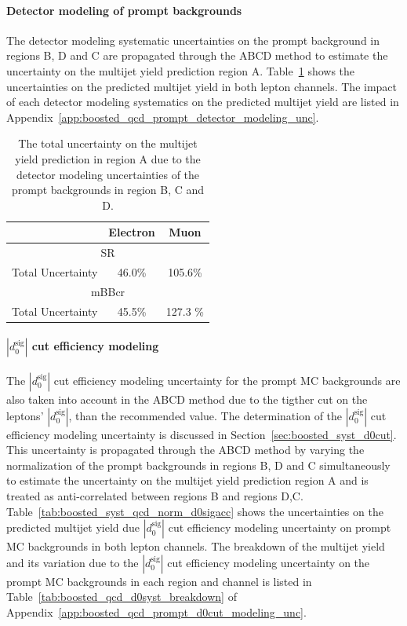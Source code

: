 \paragraph{Detector modeling of prompt backgrounds}
 The detector modeling systematic uncertainties
on the prompt background in regions B, D and C are propagated through the ABCD method to estimate
the uncertainty on the multijet yield prediction region A. Table~\ref{tab:boosted_syst_qcd_norm_detmodel}
shows the uncertainties on the predicted multijet yield in both lepton channels. The impact of each detector
modeling systematics on the predicted multijet yield are listed in Appendix~\ref{app:boosted_qcd_prompt_detector_modeling_unc}.
 
\begin{table}[!htbp]
\begin{center}
\begin{tabular}{c|c|c}
& Electron  & Muon  \\  
\hline
\multicolumn{3}{c}{SR} \\
\hline
Total Uncertainty          &  46.0\%  &  105.6\%   \\
\hline
\multicolumn{3}{c}{mBBcr} \\
\hline
Total Uncertainty          &  45.5\%  &  127.3  \%   \\
\hline
\end{tabular}
\end{center}
\caption{The total uncertainty on the multijet yield prediction in region A due to the detector modeling
uncertainties of the prompt backgrounds in region B, C and D.}
\label{tab:boosted_syst_qcd_norm_detmodel}
\end{table}
 
\paragraph{$|d_{0}^{\textrm{sig}}|$ cut efficiency modeling}
The $|d_{0}^{\textrm{sig}}|$ cut efficiency modeling uncertainty for the prompt MC backgrounds
are also taken into account in the ABCD method due to the tigther cut on the leptons' $|d_{0}^{\textrm{sig}}|$,
than the recommended value. The determination of the $|d_{0}^{\textrm{sig}}|$ cut efficiency modeling uncertainty
is discussed in Section~\ref{sec:boosted_syst_d0cut}. This uncertainty is propagated through the ABCD method
by varying the normalization of the prompt backgrounds in regions B, D and C simultaneously to estimate
the uncertainty on the multijet yield prediction region A and is treated as anti-correlated between regions B and regions D,C.
Table~\ref{tab:boosted_syst_qcd_norm_d0sigacc} shows the uncertainties on the predicted multijet yield due
$|d_{0}^{\textrm{sig}}|$ cut efficiency modeling uncertainty on prompt MC backgrounds in both lepton channels.
The breakdown of the multijet yield and its variation due to the $|d_{0}^{\textrm{sig}}|$ cut efficiency modeling uncertainty
on the prompt MC backgrounds in each region and channel is listed in Table~\ref{tab:boosted_qcd_d0syst_breakdown} of
Appendix~\ref{app:boosted_qcd_prompt_d0cut_modeling_unc}.
 
